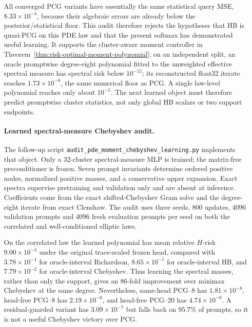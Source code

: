 \documentclass[11pt]{article}
\begin{document}
All converged PCG variants have essentially the same statistical query MSE,
\(8.33\times10^{-4}\), because their algebraic errors are already below the
posterior/statistical floor.  This audit therefore rejects the hypotheses
that HB is quasi-PCG on this PDE law and that the present softmax has
demonstrated useful learning.  It supports the cluster-aware moment
controller in Theorem~\ref{thm:risk-optimal-moment-polynomial}: on an
independent split, an oracle promptwise degree-eight polynomial fitted to the
unweighted effective spectral measure has spectral risk below \(10^{-15}\);
its reconstructed float32 iterate reaches \(1.73\times10^{-8}\), the same
numerical floor as PCG.  A single law-level polynomial reaches only about
\(10^{-5}\).  The next learned object must therefore predict promptwise
cluster statistics, not only global HB scalars or two support endpoints.

\paragraph{Learned spectral-measure Chebyshev audit.}
The follow-up script
\texttt{audit\_pde\_moment\_chebyshev\_learning.py} implements that object.
Only a 32-cluster spectral-measure MLP is trained; the matrix-free
preconditioner is frozen.  Seven prompt invariants determine ordered positive
nodes, normalized positive masses, and a conservative upper expansion.
Exact spectra supervise pretraining and validation only and are absent at
inference.  Coefficients come from the exact shifted-Chebyshev Gram solve and
the degree-eight iterate from exact Clenshaw.  The audit uses three seeds,
800 updates, 4096 validation prompts and 4096 fresh evaluation prompts per
seed on both the correlated and well-conditioned elliptic laws.

On the correlated law the learned polynomial has mean relative \(H\)-risk
\(9.00\times10^{-4}\) under the original trace-scaled frozen head, compared
with \(3.78\times10^{-1}\) for oracle-interval
Richardson, \(8.65\times10^{-1}\) for oracle-interval HB, and
\(7.79\times10^{-2}\) for oracle-interval Chebyshev.  Thus learning the
spectral masses, rather than only the support, gives an 86-fold improvement
over minimax Chebyshev at the same degree.  Nevertheless, same-head PCG--8
has \(1.81\times10^{-8}\), head-free PCG--8 has \(2.19\times10^{-6}\), and
head-free PCG--20 has \(4.74\times10^{-8}\).  A residual-guarded variant has
\(3.09\times10^{-7}\) but falls back on \(95.7\%\) of prompts, so it is not a
useful Chebyshev victory over PCG.
\end{document}
